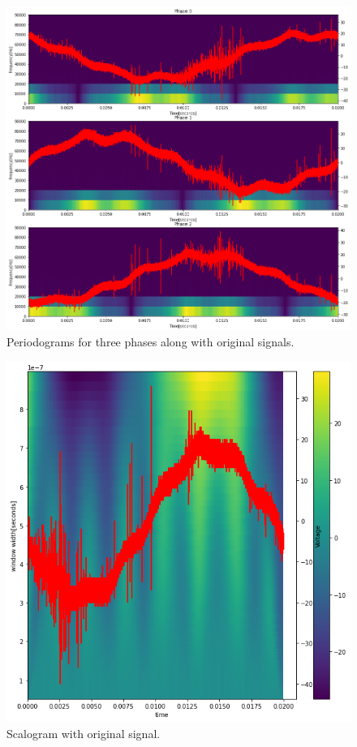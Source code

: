 \documentclass{article}
\begin{document}
\begin{figure}
    \centering
    \includegraphics[width=0.8\linewidth]{stft.png}
    \caption{Periodograms for three phases along with original signals.}
    \label{fig:periodogram}
\end{figure}

\begin{figure}
    \centering
    \includegraphics[width=0.6\linewidth]{cwt.png}
    \caption{Scalogram with original signal.}
    \label{fig:scalogram}
\end{figure}
\end{document}
